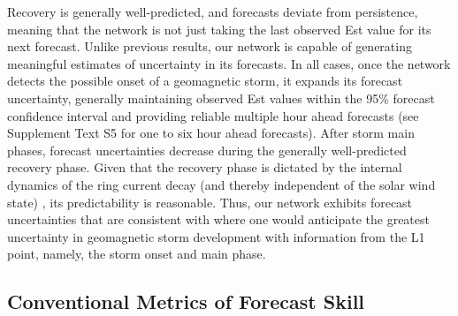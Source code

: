 \documentclass[draft,linenumbers]{agujournal2018}
\begin{document}
Recovery is generally well-predicted, and forecasts deviate from persistence, meaning that the network is not just taking the last observed Est value for its next forecast. Unlike previous results, our network is capable of generating meaningful estimates of uncertainty in its forecasts. In all cases, once the network detects the possible onset of a geomagnetic storm, it expands its forecast uncertainty, generally maintaining observed Est values within the 95\% forecast confidence interval and providing reliable multiple hour ahead forecasts (see Supplement Text S5 for one to six hour ahead forecasts). After storm main phases, forecast uncertainties decrease during the generally well-predicted recovery phase. Given that the recovery phase is dictated by the internal dynamics of the ring current decay (and thereby independent of the solar wind state) \citep{Daglis2007}, its predictability is reasonable. Thus, our network exhibits forecast uncertainties that are consistent with where one would anticipate the greatest uncertainty in geomagnetic storm development with information from the L1 point, namely, the storm onset and main phase.

\subsection{Conventional Metrics of Forecast Skill}
\end{document}

